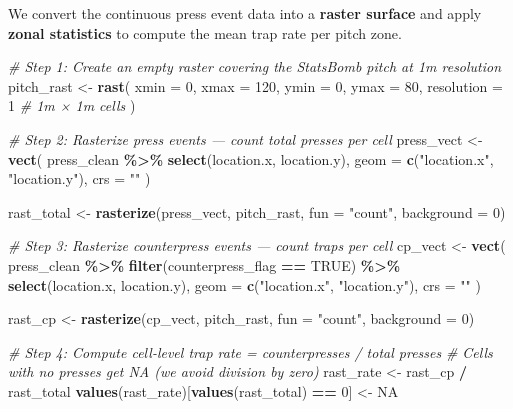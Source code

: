 \documentclass[
]{article}
\newenvironment{Shaded}{\begin{snugshade}}{\end{snugshade}}
\newcommand{\AttributeTok}[1]{\textcolor[rgb]{0.13,0.29,0.53}{#1}}
\newcommand{\CommentTok}[1]{\textcolor[rgb]{0.56,0.35,0.01}{\textit{#1}}}
\newcommand{\ConstantTok}[1]{\textcolor[rgb]{0.56,0.35,0.01}{#1}}
\newcommand{\DecValTok}[1]{\textcolor[rgb]{0.00,0.00,0.81}{#1}}
\newcommand{\FunctionTok}[1]{\textcolor[rgb]{0.13,0.29,0.53}{\textbf{#1}}}
\newcommand{\NormalTok}[1]{#1}
\newcommand{\OtherTok}[1]{\textcolor[rgb]{0.56,0.35,0.01}{#1}}
\newcommand{\SpecialCharTok}[1]{\textcolor[rgb]{0.81,0.36,0.00}{\textbf{#1}}}
\newcommand{\StringTok}[1]{\textcolor[rgb]{0.31,0.60,0.02}{#1}}
\begin{document}
We convert the continuous press event data into a \textbf{raster
surface} and apply \textbf{zonal statistics} to compute the mean trap
rate per pitch zone.

\begin{Shaded}
\begin{Highlighting}[]
\CommentTok{\# Step 1: Create an empty raster covering the StatsBomb pitch at 1m resolution}
\NormalTok{pitch\_rast }\OtherTok{\textless{}{-}} \FunctionTok{rast}\NormalTok{(}
  \AttributeTok{xmin =} \DecValTok{0}\NormalTok{, }\AttributeTok{xmax =} \DecValTok{120}\NormalTok{,}
  \AttributeTok{ymin =} \DecValTok{0}\NormalTok{, }\AttributeTok{ymax =} \DecValTok{80}\NormalTok{,}
  \AttributeTok{resolution =} \DecValTok{1}    \CommentTok{\# 1m × 1m cells}
\NormalTok{)}

\CommentTok{\# Step 2: Rasterize press events — count total presses per cell}
\NormalTok{press\_vect }\OtherTok{\textless{}{-}} \FunctionTok{vect}\NormalTok{(}
\NormalTok{  press\_clean }\SpecialCharTok{\%\textgreater{}\%} \FunctionTok{select}\NormalTok{(location.x, location.y),}
  \AttributeTok{geom =} \FunctionTok{c}\NormalTok{(}\StringTok{"location.x"}\NormalTok{, }\StringTok{"location.y"}\NormalTok{),}
  \AttributeTok{crs  =} \StringTok{""}
\NormalTok{)}

\NormalTok{rast\_total }\OtherTok{\textless{}{-}} \FunctionTok{rasterize}\NormalTok{(press\_vect, pitch\_rast, }\AttributeTok{fun =} \StringTok{"count"}\NormalTok{, }\AttributeTok{background =} \DecValTok{0}\NormalTok{)}

\CommentTok{\# Step 3: Rasterize counterpress events — count traps per cell}
\NormalTok{cp\_vect }\OtherTok{\textless{}{-}} \FunctionTok{vect}\NormalTok{(}
\NormalTok{  press\_clean }\SpecialCharTok{\%\textgreater{}\%} \FunctionTok{filter}\NormalTok{(counterpress\_flag }\SpecialCharTok{==} \ConstantTok{TRUE}\NormalTok{) }\SpecialCharTok{\%\textgreater{}\%}
    \FunctionTok{select}\NormalTok{(location.x, location.y),}
  \AttributeTok{geom =} \FunctionTok{c}\NormalTok{(}\StringTok{"location.x"}\NormalTok{, }\StringTok{"location.y"}\NormalTok{),}
  \AttributeTok{crs  =} \StringTok{""}
\NormalTok{)}

\NormalTok{rast\_cp }\OtherTok{\textless{}{-}} \FunctionTok{rasterize}\NormalTok{(cp\_vect, pitch\_rast, }\AttributeTok{fun =} \StringTok{"count"}\NormalTok{, }\AttributeTok{background =} \DecValTok{0}\NormalTok{)}

\CommentTok{\# Step 4: Compute cell{-}level trap rate = counterpresses / total presses}
\CommentTok{\# Cells with no presses get NA (we avoid division by zero)}
\NormalTok{rast\_rate }\OtherTok{\textless{}{-}}\NormalTok{ rast\_cp }\SpecialCharTok{/}\NormalTok{ rast\_total}
\FunctionTok{values}\NormalTok{(rast\_rate)[}\FunctionTok{values}\NormalTok{(rast\_total) }\SpecialCharTok{==} \DecValTok{0}\NormalTok{] }\OtherTok{\textless{}{-}} \ConstantTok{NA}


\end{Highlighting}
\end{Shaded}
\end{document}
